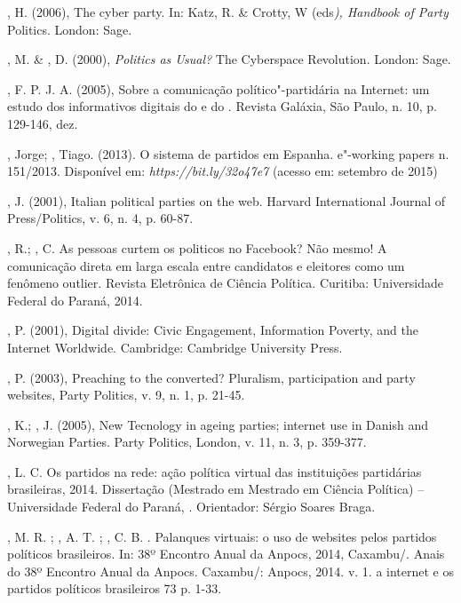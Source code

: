 \begin{Parskip}
, H. (2006), The cyber party. In: Katz, R. \& Crotty, W
(eds\emph{), Handbook of Party} Politics. London: Sage.

, M. \& , D. (2000), \emph{Politics as Usual?} The
Cyberspace Revolution. London: Sage.

, F. P. J. A. (2005), Sobre a comunicação político"-partidária na
Internet: um estudo dos informativos digitais do  e do . Revista
Galáxia, São Paulo, n. 10, p. 129-146, dez.

, Jorge; , Tiago. (2013). O sistema de partidos em Espanha.
 e"-working papers n. 151/2013. Disponível em:
\emph{https://bit.ly/32o47e7}
(acesso em: setembro de 2015)

, J. (2001), Italian political parties on the web. Harvard
International Journal of Press/Politics, v. 6, n. 4, p. 60-87.

, R.; , C. As pessoas curtem os politicos no Facebook? Não
mesmo! A comunicação direta em larga escala entre candidatos e eleitores
como um fenômeno outlier. Revista Eletrônica de Ciência Política.
Curitiba: Universidade Federal do Paraná, 2014.

, P. (2001), Digital divide: Civic Engagement, Information
Poverty, and the Internet Worldwide. Cambridge: Cambridge University
Press.

, P. (2003), Preaching to the converted? Pluralism, participation
and party websites, Party Politics, v. 9, n. 1, p. 21-45.

, K.; , J. (2005), New Tecnology in ageing parties;
internet use in Danish and Norwegian Parties. Party Politics, London, v.
11, n. 3, p. 359-377.

, L. C. Os partidos na rede: ação política virtual das instituições
partidárias brasileiras, 2014. Dissertação (Mestrado em Mestrado em
Ciência Política) -- Universidade Federal do Paraná, . Orientador:
Sérgio Soares Braga.

, M. R. ; , A. T. ; , C. B. . Palanques
virtuais: o uso de websites pelos partidos políticos brasileiros. In:
38º Encontro Anual da Anpocs, 2014, Caxambu/. Anais do 38º Encontro
Anual da Anpocs. Caxambu/: Anpocs, 2014. v. 1. a internet e os
partidos políticos brasileiros 73 p. 1-33.


\end{Parskip}
